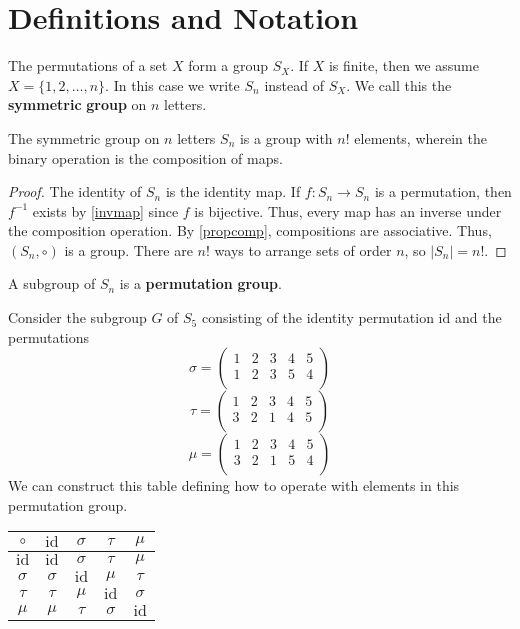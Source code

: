 \documentclass[12pt, letterpaper]{report}
\begin{document}
\section{Definitions and Notation}
The permutations of a set \(X\) form a group \(S_X\). If \(X\) is finite, then we assume \(X=\{ 1,2,\ldots,n \} \). In this case we write \(S_n\) instead of \(S_X \). We call this the \textbf{symmetric} \textbf{group} on \(n\) letters. 
\begin{theorem}
	The symmetric group on \(n\) letters \(S_n\) is a group with \(n!\) elements, wherein the binary operation is the composition of maps.
\end{theorem}
\begin{proof}
	The identity of \(S_n\) is the identity map. If \(f:S_n \to S_n\) is a permutation, then \(f^{-1} \) exists by \ref{invmap} since \(f\) is bijective. Thus, every map has an inverse under the composition operation. By \ref{propcomp}, compositions are associative. Thus, \((S_n,\circ )\) is a group. There are \(n!\) ways to arrange sets of order \(n\), so \(\left\vert S_n \right\vert=n! \).
\end{proof}
\begin{definition}
	A subgroup of \(S_n\) is a \textbf{permutation} \textbf{group}.
\end{definition}
\begin{eg}
	Consider the subgroup \(G\) of \(S_5\) consisting of the identity permutation \(\text{id} \) and the permutations 
	\[
		\sigma =\begin{pmatrix}
			1 &2  &3  &4  &5   \\
			 1&2  &3  &5  &4   \\
		\end{pmatrix}
	\]
	\[
		\tau =\begin{pmatrix}
			1 &2  &3  &4  &5   \\
			 3&2  &1  &4 &5   \\
		\end{pmatrix}
	\]
	\[
		\mu =\begin{pmatrix}
			1 &2  &3  &4  &5   \\
			 3&2  &1  &5  &4   \\
		\end{pmatrix}
	\]
	We can construct this table defining how to operate with elements in this permutation group.
	\begin{center}\begin{tabular}{c|cccc}
		\(\circ \) &\(\text{id} \) &\(\sigma \) &\(\tau \) &\(\mu \)\\
		\hline
		\(\text{id} \) &\(\text{id} \) &\(\sigma \) &\(\tau \) &\(\mu \)\\
		\(\sigma \)&\(\sigma \)&\(\text{id} \)&\(\mu \)&\(\tau \)\\
		\(\tau \)&\(\tau \)&\(\mu \)&\(\text{id} \)&\(\sigma \)\\
		\(\mu \)&\(\mu \)&\(\tau \)&\(\sigma \)&\(\text{id} \)
	\end{tabular}\end{center}
\end{eg}
\end{document}
